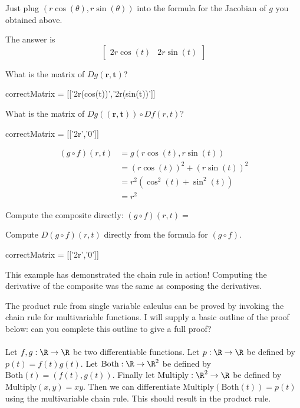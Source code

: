 \documentclass{ximera}
\begin{document}
\begin{question}
	\begin{solution}
		\begin{hint}
			Just plug $(r\cos(\theta),r\sin(\theta))$ into the formula for the Jacobian of $g$ you obtained above.
		\end{hint}
		\begin{hint}
			The answer is \[\begin{bmatrix} 2r\cos(t) &2r\sin(t)\end{bmatrix}\]
		\end{hint}
		What is the matrix of $Dg(\mathbf{r,t})$?
		\begin{matrix-derivative}
			correctMatrix = [['2r(cos(t))','2r(sin(t))']]
		\end{matrix-derivative}
	\end{solution}
	
	\begin{solution}
		What is the matrix of $Dg(\mathbf{(r,t)}) \circ Df(r,t)$?
			\begin{matrix-answer}
				correctMatrix = [['2r','0']]
			\end{matrix-answer}
	\end{solution}
	
	\begin{solution}
		\begin{hint}
			\begin{align*}
				(g \circ f)(r,t) &= g(r\cos(t),r\sin(t))\\
				 &=(r\cos(t))^2+(r\sin(t))^2\\
				 &=r^2(\cos^2(t)+\sin^2(t))\\
				 &=r^2
			\end{align*}
		\end{hint}
		Compute the composite directly: $(g \circ f)(r,t) =$\answer{$r^2$}
	\end{solution}
	
	\begin{solution}
		Compute $D(g \circ f)(r,t)$ directly from the formula for $(g \circ f)$.
		\begin{matrix-answer}
			correctMatrix = [['2r','0']]
		\end{matrix-answer}
	\end{solution}
	
	This example has demonstrated the chain rule in action!  Computing the derivative of the composite was the same as composing the derivatives.
\end{question}

The product rule from single variable calculus can be proved by invoking the chain rule for multivariable functions.  I will supply a basic outline of the proof below:
can you complete this outline to give a full proof?
\\
\\
Let $f,g:\R \to \R$ be two differentiable functions. Let $p:\R \to \R$ be defined by $p(t) = f(t)g(t)$. Let $\text{Both}:\R \to \R^2$ be defined by $\text{Both}(t) = (f(t),g(t))$.  
Finally let $\text{Multiply}:\R^2 \to \R$ be defined by $\text{Multiply}(x,y) = xy$.  Then we can differentiate $\text{Multiply}(\text{Both}(t)) = p(t)$ using the multivariable chain rule.
This should result in the product rule.
\end{document}
